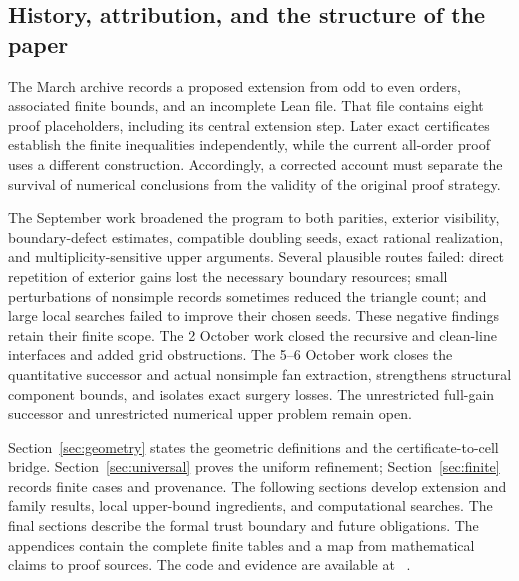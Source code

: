 \subsection{History, attribution, and the structure of the paper}

The March archive records a proposed extension from odd to even orders, associated finite bounds, and an incomplete Lean file. That file contains eight proof placeholders, including its central extension step. Later exact certificates establish the finite inequalities independently, while the current all-order proof uses a different construction. Accordingly, a corrected account must separate the survival of numerical conclusions from the validity of the original proof strategy.

The September work broadened the program to both parities, exterior visibility, boundary-defect estimates, compatible doubling seeds, exact rational realization, and multiplicity-sensitive upper arguments. Several plausible routes failed: direct repetition of exterior gains lost the necessary boundary resources; small perturbations of nonsimple records sometimes reduced the triangle count; and large local searches failed to improve their chosen seeds. These negative findings retain their finite scope. The 2 October work closed the recursive and clean-line interfaces and added grid obstructions. The 5--6 October work closes the quantitative successor and actual nonsimple fan extraction, strengthens structural component bounds, and isolates exact surgery losses. The unrestricted full-gain successor and unrestricted numerical upper problem remain open.

Section~\ref{sec:geometry} states the geometric definitions and the certificate-to-cell bridge. Section~\ref{sec:universal} proves the uniform refinement; Section~\ref{sec:finite} records finite cases and provenance. The following sections develop extension and family results, local upper-bound ingredients, and computational searches. The final sections describe the formal trust boundary and future obligations. The appendices contain the complete finite tables and a map from mathematical claims to proof sources. The code and evidence are available at \repo~\cite{zarzueloRepository}.
